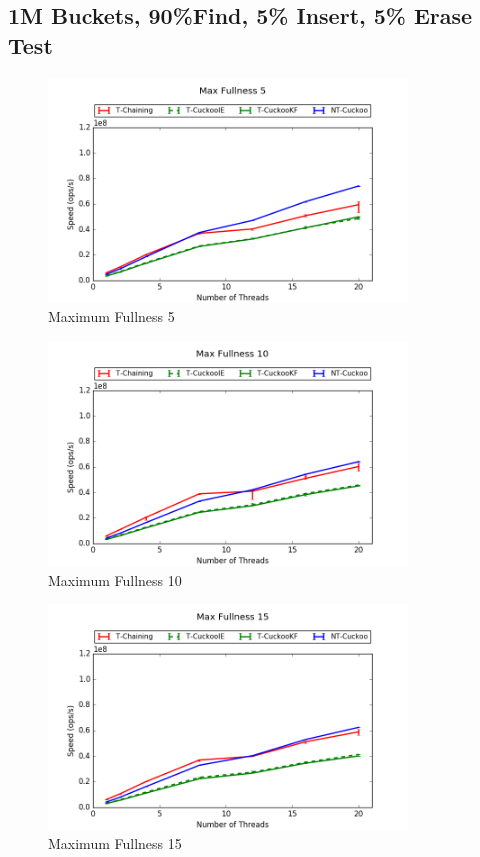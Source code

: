 \subsection{1M Buckets, 90\%Find, 5\% Insert, 5\% Erase Test}
\begin{figure}[H]
    \centering
	\includegraphics[width=0.85\textwidth]{maps/5HM1M:F90,I5,E5.png} 
        \caption*{Maximum Fullness 5}
\end{figure}
\begin{figure}[H]
    \centering
	\includegraphics[width=0.85\textwidth]{maps/10HM1M:F90,I5,E5.png} 
        \caption*{Maximum Fullness 10}
\end{figure}
\begin{figure}[H]
    \centering
	\includegraphics[width=0.85\textwidth]{maps/15HM1M:F90,I5,E5.png} 
        \caption*{Maximum Fullness 15}
\end{figure}


